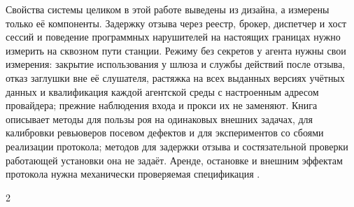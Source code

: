 \documentclass[10pt,a4paper]{article}
\begin{document}
Свойства системы целиком в этой работе выведены из дизайна, а измерены только её компоненты. Задержку отзыва через реестр, брокер, диспетчер и хост сессий и поведение программных нарушителей на настоящих границах нужно измерить на сквозном пути станции. Режиму без секретов у агента нужны свои измерения: закрытие использования у шлюза и службы действий после отзыва, отказ заглушки вне её слушателя, растяжка на всех выданных версиях учётных данных и квалификация каждой агентской среды с настроенным адресом провайдера; прежние наблюдения входа и прокси их не заменяют. Книга \cite{swarmabook} описывает методы для пользы роя на одинаковых внешних задачах, для калибровки ревьюверов посевом дефектов и для экспериментов со сбоями реализации протокола; методов для задержки отзыва и состязательной проверки работающей установки она не задаёт. Аренде, остановке и внешним эффектам протокола нужна механически проверяемая спецификация \cite{tla}.

\raggedcolumns
\begin{multicols}{2}
\footnotesize\raggedright

\setlength{\itemsep}{0pt}

\end{multicols}
\end{document}
